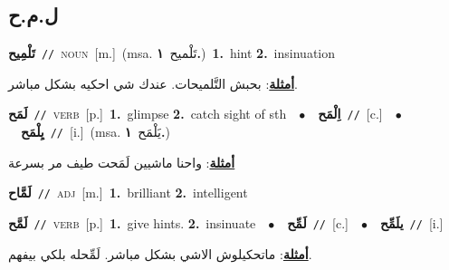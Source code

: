 \documentclass[10pt,a4paper,twoside]{article} %
\begin{document}
\begin{multicols}{2}
\vspace{-3mm}
\subsection*{\color{blue}\foreignlanguage{arabic}{ل.م.ح}\color{blue}{}} 

{\setlength\topsep{0pt}\textbf{\foreignlanguage{arabic}{تَلْمِيح}}\ {\color{gray}\texttt{//}\color{black}}\ \textsc{noun}\ [m.]\ \color{gray}(msa. \foreignlanguage{arabic}{تَلْميح}~\foreignlanguage{arabic}{\textbf{١.}})\color{black}\ \textbf{1.}~hint  \textbf{2.}~insinuation\  \begin{flushright}\color{gray}\foreignlanguage{arabic}{\textbf{\underline{\foreignlanguage{arabic}{أمثلة}}}: بحبش التَّلميحات. عندك شي احكيه بشكل مباشر.}\end{flushright}\color{black}} \vspace{2mm}

{\setlength\topsep{0pt}\textbf{\foreignlanguage{arabic}{لَمَح}}\ {\color{gray}\texttt{//}\color{black}}\ \textsc{verb}\ [p.]\ \textbf{1.}~glimpse  \textbf{2.}~catch sight of sth\ \ $\bullet$\ \ \setlength\topsep{0pt}\textbf{\foreignlanguage{arabic}{اِلْمَح}}\ {\color{gray}\texttt{//}\color{black}}\ [c.]\ \ $\bullet$\ \ \setlength\topsep{0pt}\textbf{\foreignlanguage{arabic}{يِلْمَح}}\ {\color{gray}\texttt{//}\color{black}}\ [i.]\ \color{gray}(msa. \foreignlanguage{arabic}{يَلْمَح}~\foreignlanguage{arabic}{\textbf{١.}})\color{black}\  \begin{flushright}\color{gray}\foreignlanguage{arabic}{\textbf{\underline{\foreignlanguage{arabic}{أمثلة}}}: واحنا ماشيين لَمَحت طيف مر بسرعة}\end{flushright}\color{black}} \vspace{2mm}

{\setlength\topsep{0pt}\textbf{\foreignlanguage{arabic}{لَمَّاح}}\ {\color{gray}\texttt{//}\color{black}}\ \textsc{adj}\ [m.]\ \textbf{1.}~brilliant  \textbf{2.}~intelligent\ } \vspace{2mm}

{\setlength\topsep{0pt}\textbf{\foreignlanguage{arabic}{لَمَّح}}\ {\color{gray}\texttt{//}\color{black}}\ \textsc{verb}\ [p.]\ \textbf{1.}~give hints.  \textbf{2.}~insinuate\ \ $\bullet$\ \ \setlength\topsep{0pt}\textbf{\foreignlanguage{arabic}{لَمِّح}}\ {\color{gray}\texttt{//}\color{black}}\ [c.]\ \ $\bullet$\ \ \setlength\topsep{0pt}\textbf{\foreignlanguage{arabic}{يلَمِّح}}\ {\color{gray}\texttt{//}\color{black}}\ [i.]\  \begin{flushright}\color{gray}\foreignlanguage{arabic}{\textbf{\underline{\foreignlanguage{arabic}{أمثلة}}}: ماتحكيلوش الاشي بشكل مباشر. لَمِّحله بلكي بيفهم.}\end{flushright}\color{black}} \vspace{2mm}


\end{multicols}
\end{document}
